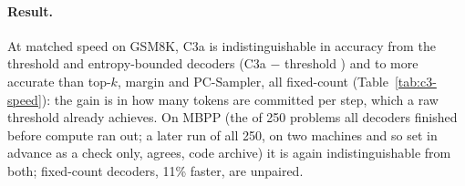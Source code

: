 \paragraph{Result.}
At matched speed on GSM8K, C3a is indistinguishable in accuracy from the threshold and
entropy-bounded decoders (C3a $-$ threshold )
and  to 
more accurate than top-$k$, margin and PC-Sampler, all fixed-count (Table~\ref{tab:c3-speed}): the gain is in how
many tokens are committed per step, which a raw threshold already achieves.
On MBPP (the  of 250 problems all decoders finished before compute ran
out; a later run of all 250, on two machines and so set in advance as a check only, agrees,
code archive) it is again indistinguishable from
both; fixed-count decoders, 11\% faster, are unpaired.
